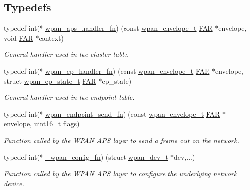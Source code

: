 \subsection*{Typedefs}
\begin{DoxyCompactItemize}
\item 
typedef int($\ast$ \hyperlink{group__wpan__aps_ga8575b0db762a5fbb858d4994c9b657e3}{wpan\+\_\+aps\+\_\+handler\+\_\+fn}) (const \hyperlink{structwpan__envelope__t}{wpan\+\_\+envelope\+\_\+t} \hyperlink{group__hal_gaef060b3456fdcc093a7210a762d5f2ed}{F\+AR} $\ast$envelope, void \hyperlink{group__hal_gaef060b3456fdcc093a7210a762d5f2ed}{F\+AR} $\ast$context)
\begin{DoxyCompactList}\small\item\em General handler used in the cluster table. \end{DoxyCompactList}\item 
typedef int($\ast$ \hyperlink{group__wpan__aps_ga23d4e0e2f2137c75700dfec73b2cc80f}{wpan\+\_\+ep\+\_\+handler\+\_\+fn}) (const \hyperlink{structwpan__envelope__t}{wpan\+\_\+envelope\+\_\+t} \hyperlink{group__hal_gaef060b3456fdcc093a7210a762d5f2ed}{F\+AR} $\ast$envelope, struct \hyperlink{structwpan__ep__state__t}{wpan\+\_\+ep\+\_\+state\+\_\+t} \hyperlink{group__hal_gaef060b3456fdcc093a7210a762d5f2ed}{F\+AR} $\ast$ep\+\_\+state)
\begin{DoxyCompactList}\small\item\em General handler used in the endpoint table. \end{DoxyCompactList}\item 
typedef int($\ast$ \hyperlink{group__wpan__aps_ga505477d0257efe527747c6d1f561cd6c}{wpan\+\_\+endpoint\+\_\+send\+\_\+fn}) (const \hyperlink{structwpan__envelope__t}{wpan\+\_\+envelope\+\_\+t} \hyperlink{group__hal_gaef060b3456fdcc093a7210a762d5f2ed}{F\+AR} $\ast$envelope, \hyperlink{group__hal__dos_ga5a8b2dc9e45a9ee81a94ef304fb62505}{uint16\+\_\+t} flags)
\begin{DoxyCompactList}\small\item\em Function called by the W\+P\+AN A\+PS layer to send a frame out on the network. \end{DoxyCompactList}\item 
typedef int($\ast$ \hyperlink{group__wpan__aps_ga9287e4838cc6dc51febe18acab6738ce}{\+\_\+wpan\+\_\+config\+\_\+fn}) (struct \hyperlink{structwpan__dev__t}{wpan\+\_\+dev\+\_\+t} $\ast$dev,...)
\begin{DoxyCompactList}\small\item\em Function called by the W\+P\+AN A\+PS layer to configure the underlying network device. \end{DoxyCompactList}\item 

\end{DoxyCompactItemize}
